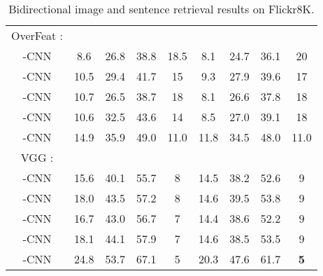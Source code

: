 \documentclass[10pt,twocolumn,letterpaper]{article}
\begin{document}
\begin{table*}
\begin{center}
\begin{tabular}{c|cccc|cccc}
        \hline
        \hline
        OverFeat \cite{sermanet_arxiv2014}:&&&&&&&& \\
        -CNN & 8.6 &26.8 &38.8&18.5 &8.1 &24.7 &36.1&20\\
        -CNN & 10.5 &29.4 &41.7&15 &9.3 &27.9 &39.6&17\\
        -CNN & 10.7 &26.5 &38.7&18 &8.1 &26.6 &37.8&18\\
        -CNN & 10.6 &32.5 &43.6&14 &8.5 &27.0 &39.1&18\\
        -CNN & {14.9} &{35.9} &{49.0}&{11.0} &{11.8} &{34.5} &{48.0}&{11.0}\\
        \hline
        \hline
        VGG \cite{simonyan_arxiv2014}:&&&&&&&& \\
        -CNN & 15.6 &40.1 &55.7&8 &14.5 & 38.2 &52.6&9\\
        -CNN & 18.0 & 43.5 &57.2&8 &14.6 &39.5 &53.8&9\\
        -CNN & 16.7 & 43.0 &56.7&7 &14.4 &38.6 &52.2&9\\
        -CNN & 18.1 &44.1 &57.9&7 &14.6 &38.5 &53.5&9\\
        -CNN &  {24.8} & {53.7}& {67.1}& {5} & {20.3} & {47.6} & {61.7}& \textbf{5}\\
        \hline
        \hline
    \end{tabular}


\end{center}
\caption{Bidirectional image and sentence retrieval results on Flickr8K.}\label{table:flickr8k}
\end{table*}
\end{document}
